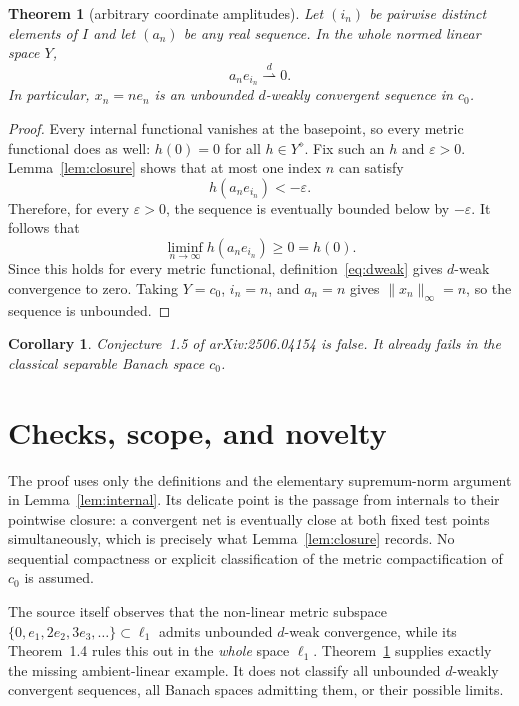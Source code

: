 \documentclass[11pt]{article}
\newtheorem{theorem}{Theorem}
\newtheorem{corollary}{Corollary}
\newcommand{\dweak}{\mathrel{\mathop{\rightharpoonup}\limits^{d}}}
\begin{document}
\begin{theorem}[arbitrary coordinate amplitudes]\label{thm:main}
Let $(i_n)$ be pairwise distinct elements of $I$ and let $(a_n)$ be any real
sequence.  In the whole normed linear space $Y$,
\[
 a_ne_{i_n}\dweak 0.
\]
In particular, $x_n=n e_n$ is an unbounded $d$-weakly convergent sequence in
$c_0$.
\end{theorem}

\begin{proof}
Every internal functional vanishes at the basepoint, so every metric
functional does as well: $h(0)=0$ for all $h\in Y^\diamond$.  Fix such an
$h$ and $\varepsilon>0$.  Lemma~\ref{lem:closure} shows that at most one index
$n$ can satisfy
\[
 h(a_ne_{i_n})<-\varepsilon.
\]
Therefore, for every $\varepsilon>0$, the sequence is eventually bounded below
by $-\varepsilon$.  It follows that
\[
 \liminf_{n\to\infty}h(a_ne_{i_n})\ge0=h(0).
\]
Since this holds for every metric functional, definition~\eqref{eq:dweak}
gives $d$-weak convergence to zero.  Taking $Y=c_0$, $i_n=n$, and $a_n=n$
gives $\lVert x_n\rVert_\infty=n$, so the sequence is unbounded.
\end{proof}

\begin{corollary}
Conjecture~1.5 of arXiv:2506.04154 is false.  It already fails in the classical
separable Banach space $c_0$.
\end{corollary}

\section{Checks, scope, and novelty}

The proof uses only the definitions and the elementary supremum-norm argument
in Lemma~\ref{lem:internal}.  Its delicate point is the passage from internals
to their pointwise closure: a convergent net is eventually close at both fixed
test points simultaneously, which is precisely what
Lemma~\ref{lem:closure} records.  No sequential compactness or explicit
classification of the metric compactification of $c_0$ is assumed.

The source itself observes that the non-linear metric subspace
$\{0,e_1,2e_2,3e_3,\ldots\}\subset\ell_1$ admits unbounded $d$-weak
convergence, while its Theorem~1.4 rules this out in the \emph{whole} space
$\ell_1$.  Theorem~\ref{thm:main} supplies exactly the missing ambient-linear
example.  It does not classify all unbounded $d$-weakly convergent sequences,
all Banach spaces admitting them, or their possible limits.
\end{document}

